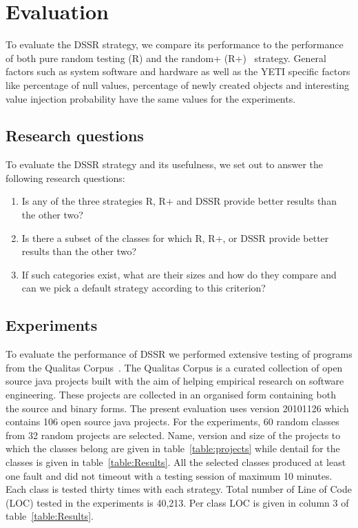 \documentclass{acm_proc_article-sp}
\begin{document}


\section{Evaluation}\label{sec:eval}

To evaluate the DSSR strategy, we compare its performance to the performance of both pure random testing (R) and the random+ (R+)~\cite{Leitner2007} strategy. General factors such as system software and hardware as well as the YETI specific factors like percentage of null values, percentage of newly created objects and interesting value injection probability have the same values for the experiments.

\subsection{Research questions}
To evaluate the DSSR strategy and its usefulness, we set out to answer the following research questions:
\begin{enumerate}
\item Is any of the three strategies R, R+ and DSSR provide better results than the other two?
\item Is there a subset of the classes for which R, R+, or DSSR provide better results than the other two?
\item If such categories exist, what are their sizes and how do they compare and can we pick a default strategy according to this criterion?
\end{enumerate}



\subsection{Experiments}

To evaluate the performance of DSSR we performed extensive testing of programs from the Qualitas Corpus~\cite{Tempero2010a}. The Qualitas Corpus is a curated collection of open source java projects built with the aim of helping empirical research on  software engineering. These projects are collected in an organised form containing both the source and binary forms. The present evaluation uses version 20101126 which contains 106 open source java projects. For the experiments, 60 random classes from 32 random projects are selected. Name, version and size of the projects to which the classes belong are given in table~\ref{table:projects} while dentail for the classes is given in table~\ref{table:Results}. All the selected classes produced at least one fault and did not timeout with a testing session of maximum 10 minutes. Each class is tested thirty times with each strategy. Total number of Line of Code (LOC) tested in the experiments is 40,213. Per class LOC is given in column 3 of table~\ref{table:Results}. 
\end{document}
